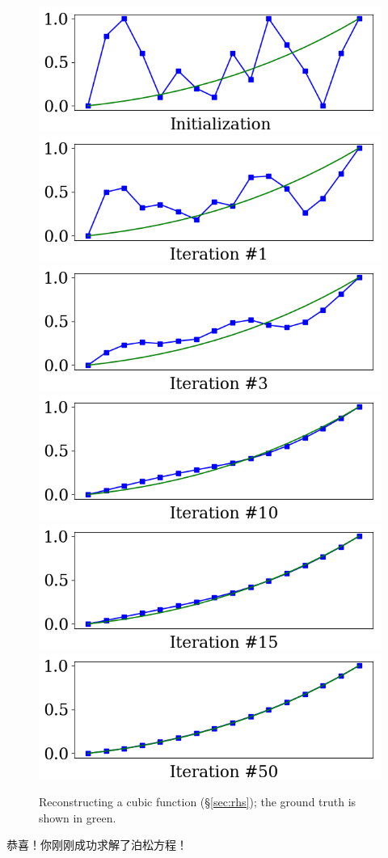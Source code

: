 \documentclass[notitlepage,oneside]{book}
\begin{document}
\begin{figure}[ht]
    \centering
    \includegraphics[width=.32\linewidth]{img/example_3_4_0.png}
    \includegraphics[width=.32\linewidth]{img/example_3_4_1.png}
    \includegraphics[width=.32\linewidth]{img/example_3_4_2.png}
    \includegraphics[width=.32\linewidth]{img/example_3_4_3.png}
    \includegraphics[width=.32\linewidth]{img/example_3_4_4.png}
    \includegraphics[width=.32\linewidth]{img/example_3_4_5.png}
    \caption{Reconstructing a cubic function (\S\ref{sec:rhs}); the ground truth is shown in green.}
    \label{fig:linsys-cubic}
\end{figure}

恭喜！你刚刚成功求解了泊松方程！


\end{document}
